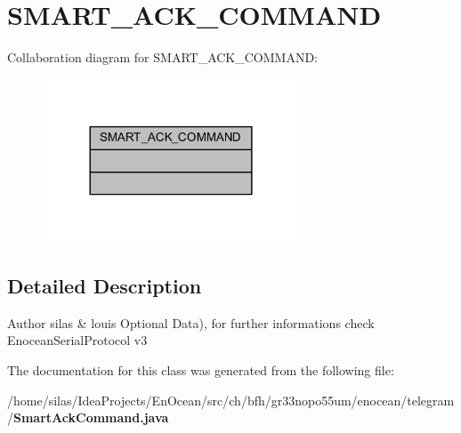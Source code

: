 \section{S\+M\+A\+R\+T\+\_\+\+A\+C\+K\+\_\+\+C\+O\+M\+M\+A\+ND}
\label{classSMART__ACK__COMMAND}


Collaboration diagram for S\+M\+A\+R\+T\+\_\+\+A\+C\+K\+\_\+\+C\+O\+M\+M\+A\+ND\+:\nopagebreak
\begin{figure}[H]
\begin{center}
\leavevmode
\includegraphics[width=216pt]{d3/d63/classSMART__ACK__COMMAND__coll__graph}
\end{center}
\end{figure}


\subsection{Detailed Description}
\begin{DoxyAuthor}{Author}
silas \& louis Optional Data), for further informations check Enocean\+Serial\+Protocol v3 
\end{DoxyAuthor}


The documentation for this class was generated from the following file\+:\begin{DoxyCompactItemize}
\item 
/home/silas/\+Idea\+Projects/\+En\+Ocean/src/ch/bfh/gr33nopo55um/enocean/telegram/{\bf Smart\+Ack\+Command.\+java}\end{DoxyCompactItemize}
